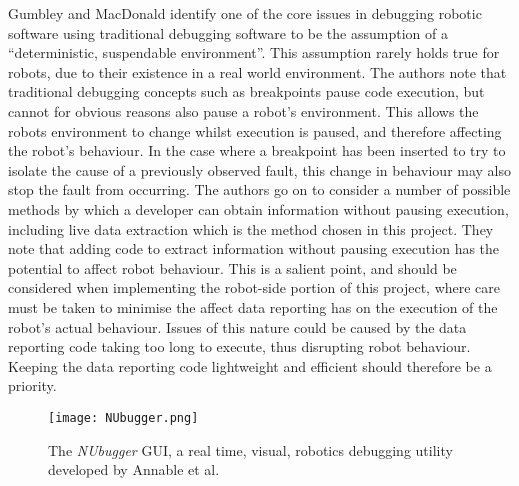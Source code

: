 Gumbley and MacDonald \cite{Gumbley:2009} identify one of the core issues in debugging robotic software using traditional debugging software to be the assumption of a ``deterministic, suspendable environment''. This assumption rarely holds true for robots, due to their existence in a real world environment. The authors note that traditional debugging concepts such as breakpoints pause code execution, but cannot for obvious reasons also pause a robot's environment. This allows the robots environment to change whilst execution is paused, and therefore affecting the robot's behaviour. In the case where a breakpoint has been inserted to try to isolate the cause of a previously observed fault, this change in behaviour may also stop the fault from occurring. The authors \cite{Gumbley:2009} go on to consider a number of possible methods by which a developer can obtain information without pausing execution, including live data extraction which is the method chosen in this project. They note that adding code to extract information without pausing execution has the potential to affect robot behaviour. This is a salient point, and should be considered when implementing the robot-side portion of this project, where care must be taken to minimise the affect data reporting has on the execution of the robot's actual behaviour. Issues of this nature could be caused by the data reporting code taking too long to execute, thus disrupting robot behaviour. Keeping the data reporting code lightweight and efficient should therefore be a priority.

\begin{figure}
 \begin{center}
 \texttt{[image: NUbugger.png]}
 \decoRule
 \caption[\textit{NUbugger} GUI. \cite{Annable:2014}]{The \textit{NUbugger} GUI, a real time, visual, robotics debugging utility developed by Annable et al. \cite{Annable:2014}}
 \label{fig:NUbugger}
 \end{center}
\end{figure}

